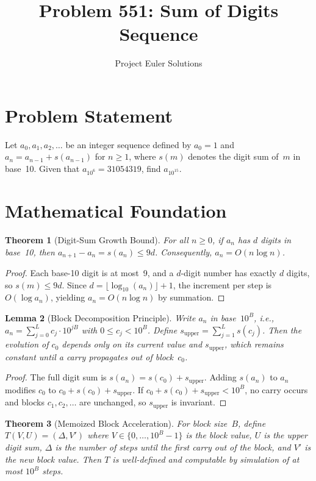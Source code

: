 \documentclass[11pt]{article}
\title{Problem 551: Sum of Digits Sequence}
\author{Project Euler Solutions}
\date{}
\newtheorem{theorem}{Theorem}
\newtheorem{lemma}[theorem]{Lemma}
\begin{document}
\maketitle

\section{Problem Statement}

Let $a_0, a_1, a_2, \ldots$ be an integer sequence defined by $a_0 = 1$ and $a_n = a_{n-1} + s(a_{n-1})$ for $n \geq 1$, where $s(m)$ denotes the digit sum of~$m$ in base~10. Given that $a_{10^6} = 31054319$, find $a_{10^{15}}$.

\section{Mathematical Foundation}

\begin{theorem}[Digit-Sum Growth Bound]
For all $n \geq 0$, if $a_n$ has $d$ digits in base~10, then $a_{n+1} - a_n = s(a_n) \leq 9d$. Consequently, $a_n = O(n \log n)$.
\end{theorem}

\begin{proof}
Each base-10 digit is at most~9, and a $d$-digit number has exactly $d$ digits, so $s(m) \leq 9d$. Since $d = \lfloor \log_{10}(a_n) \rfloor + 1$, the increment per step is $O(\log a_n)$, yielding $a_n = O(n \log n)$ by summation.
\end{proof}

\begin{lemma}[Block Decomposition Principle]
Write $a_n$ in base~$10^B$, i.e., $a_n = \sum_{j=0}^{L} c_j \cdot 10^{jB}$ with $0 \leq c_j < 10^B$. Define $s_{\mathrm{upper}} = \sum_{j=1}^{L} s(c_j)$. Then the evolution of $c_0$ depends only on its current value and $s_{\mathrm{upper}}$, which remains constant until a carry propagates out of block~$c_0$.
\end{lemma}

\begin{proof}
The full digit sum is $s(a_n) = s(c_0) + s_{\mathrm{upper}}$. Adding $s(a_n)$ to $a_n$ modifies $c_0$ to $c_0 + s(c_0) + s_{\mathrm{upper}}$. If $c_0 + s(c_0) + s_{\mathrm{upper}} < 10^B$, no carry occurs and blocks $c_1, c_2, \ldots$ are unchanged, so $s_{\mathrm{upper}}$ is invariant.
\end{proof}

\begin{theorem}[Memoized Block Acceleration]
For block size~$B$, define $T(V, U) = (\Delta, V')$ where $V \in \{0, \ldots, 10^B - 1\}$ is the block value, $U$ is the upper digit sum, $\Delta$ is the number of steps until the first carry out of the block, and $V'$ is the new block value. Then $T$ is well-defined and computable by simulation of at most $10^B$ steps.
\end{theorem}
\end{document}
